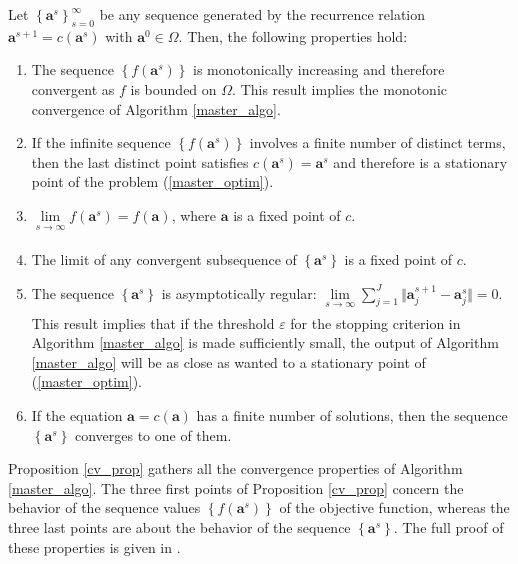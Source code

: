 \documentclass[
]{jss}
\begin{document}
\begin{proposition}
    Let $\left\lbrace  \mathbf a^s\right\rbrace_{s=0}^{\infty}$ be any sequence generated by the recurrence relation $\mathbf a^{s+1} = c( \mathbf a^s)$ with $\mathbf a^0\in\Omega$. Then, the following properties hold:
    \begin{enumerate}[topsep=0pt,itemsep=-0.75ex,partopsep=1ex,parsep=1ex, label = {(\alph*)}]
        \item  \label{prop_pt1} The sequence $\left\lbrace f( \mathbf a^s)\right\rbrace $ is monotonically increasing and therefore convergent as $f$ is bounded on $\Omega$. This result implies the monotonic convergence of Algorithm \ref{master_algo}.
        \item  \label{prop_pt2} If the infinite sequence $\left\lbrace f( \mathbf a^s)\right\rbrace $ involves a finite number of distinct terms, then the last distinct point satisfies $c( \mathbf a^s) =  \mathbf a^s$ and therefore is a stationary point of the problem (\ref{master_optim}). 
    \item  \label{prop_pt3} $\underset{s\xrightarrow[]{}\infty}\lim{f( \mathbf a^s) = f( \mathbf a)}$, where $\mathbf a$ is a fixed point of $c$.
        \item  \label{prop_pt4} The limit of any convergent subsequence of $\left\lbrace  \mathbf a^s\right\rbrace $ is a fixed point of $c$.
        \item  \label{prop_pt5} The sequence $\left\lbrace  \mathbf a^s \right\rbrace $ is asymptotically regular: $\underset{s\xrightarrow[]{}\infty}\lim{\sum_{j=1}^{J} \Vert  \mathbf a_j^{s+1} -  \mathbf a_j^s \Vert} = 0$. This result implies that if the threshold $\varepsilon$ for the stopping criterion in Algorithm \ref{master_algo} is made sufficiently small, the output of Algorithm \ref{master_algo} will be as close as wanted to a stationary point of (\ref{master_optim}). 
        \item  \label{prop_pt6} If the equation $\mathbf a = c( \mathbf a)$ has a finite number of solutions, then the sequence $\left\lbrace  \mathbf a^s\right\rbrace $ converges to one of them.
    \end{enumerate}
    \label{cv_prop}
\end{proposition}

Proposition \ref{cv_prop} gathers all the convergence properties of
Algorithm \ref{master_algo}. The three first points of Proposition
\ref{cv_prop} concern the behavior of the sequence values
\(\left\lbrace f( \mathbf a^s) \right\rbrace\) of the objective
function, whereas the three last points are about the behavior of the
sequence \(\left\lbrace  \mathbf a^s \right\rbrace\). The full proof of
these properties is given in \cite{Tenenhaus2017}.
\end{document}
